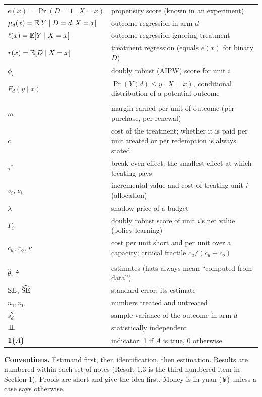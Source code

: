 \documentclass[11pt]{article}
\begin{document}
\begin{center}
\begin{tabularx}{\linewidth}{@{}lX@{}}
$e(x) = \Pr(D=1 \mid X=x)$ & propensity score (known in an experiment) \\
$\mu_d(x) = \mathbb{E}[Y \mid D=d, X=x]$ & outcome regression in arm $d$ \\
$\ell(x) = \mathbb{E}[Y \mid X=x]$ & outcome regression ignoring treatment \\
$r(x) = \mathbb{E}[D \mid X=x]$ & treatment regression (equals $e(x)$ for binary $D$) \\
$\phi_i$ & doubly robust (AIPW) score for unit $i$ \\
$F_d(y \mid x)$ & $\Pr(Y(d) \le y \mid X = x)$, conditional distribution of a potential outcome \\
\addlinespace
\multicolumn{2}{@{}l}{\textit{Economics of the decision}} \\
$m$ & margin earned per unit of outcome (per purchase, per renewal) \\
$c$ & cost of the treatment; whether it is paid per unit treated or per redemption is always stated \\
$\tau^{\ast}$ & break-even effect: the smallest effect at which treating pays \\
$v_i$, $c_i$ & incremental value and cost of treating unit $i$ (allocation) \\
$\lambda$ & shadow price of a budget \\
$\Gamma_i$ & doubly robust score of unit $i$'s net value (policy learning) \\
$c_u$, $c_o$, $\kappa$ & cost per unit short and per unit over a capacity; critical fractile $c_u/(c_u + c_o)$ \\
\addlinespace
\multicolumn{2}{@{}l}{\textit{Estimation and inference}} \\
$\hat\theta$, $\hat{\tau}$ & estimates (hats always mean ``computed from data'') \\
$\operatorname{SE}$, $\widehat{\operatorname{SE}}$ & standard error; its estimate \\
$n_1, n_0$ & numbers treated and untreated \\
$s_d^2$ & sample variance of the outcome in arm $d$ \\
$\perp\!\!\!\perp$ & statistically independent \\
$\mathbf{1}\{A\}$ & indicator: 1 if $A$ is true, 0 otherwise \\
\bottomrule
\end{tabularx}
\end{center}

\textbf{Conventions.} Estimand first, then identification, then estimation. Results are numbered within
each set of notes (Result 1.3 is the third numbered item in Section 1). Proofs are short and give the idea
first. Money is in yuan (¥) unless a case says otherwise.
\end{document}
